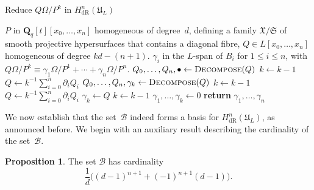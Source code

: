 \documentclass[a4paper,11pt]{article}
\numberwithin{equation}{section}
\newcommand{\QQ}{\mathbf{Q}} %
\providecommand{\HdR}{H_{\text{dR}}}    %
\providecommand{\cB}{\mathcal{B}} %
\theoremstyle{definition}
\newtheorem{prop}[thm]{Proposition}
\begin{document}
\begin{algorithm}
\caption{Reduce $Q \Omega / P^k$ in $\HdR^n(\mathfrak{U}_L)$}
\label{alg:PoleRed}
\begin{algorithmic}
\vspace{1mm}
\Require  $P$ in $\QQ_q[t][x_0, \dotsc, x_n]$ homogeneous of degree~$d$, 
         defining a family $\mathfrak{X}/\mathfrak{S}$ of smooth projective 
         hypersurfaces that contains a diagonal fibre, $Q \in L[x_0, \dotsc, x_n]$ 
         homogeneous of degree $kd - (n+1)$.
\Ensure  $\gamma_i$ in the $L$-span of $B_i$ for $1 \leq i \leq n$, with  
         $Q \Omega / P^k \equiv \gamma_{1} \Omega / P^{1} + \dotsb + \gamma_n \Omega / P^n$.
\State $Q_0, \dotsc, Q_n, \bullet \gets \Call{Decompose}{Q}$
\State $k \gets k-1$
\State $Q \gets k^{-1} \sum_{i=0}^n \partial_i Q_i$
\EndWhile
{}
\State $Q_0, \dotsc, Q_n, \gamma_k \gets \Call{Decompose}{Q}$
\State $k \gets k-1$
\State $Q \gets k^{-1} \sum_{i=0}^n \partial_i Q_i$
\EndWhile
{}
\State $\gamma_{k} \gets Q$
\State $k \gets k-1$
\EndIf
\State $\gamma_{1}, \dotsc, \gamma_{k} \gets 0$
\State \textbf{return} $\gamma_{1}, \dotsc, \gamma_n$
\EndProcedure
\end{algorithmic}
\end{algorithm}

We now establish that the set~$\cB$ indeed forms a basis for 
$\HdR^n(\mathfrak{U}_L)$, as announced before.  We begin with an 
auxiliary result describing the cardinality of the set~$\cB$.

\begin{prop} \label{prop:BasisSize}
The set $\cB$ has cardinality
\begin{equation}
\frac{1}{d} \bigl((d-1)^{n+1} + (-1)^{n+1}(d-1) \bigr).
\end{equation}
\end{prop}
\end{document}
